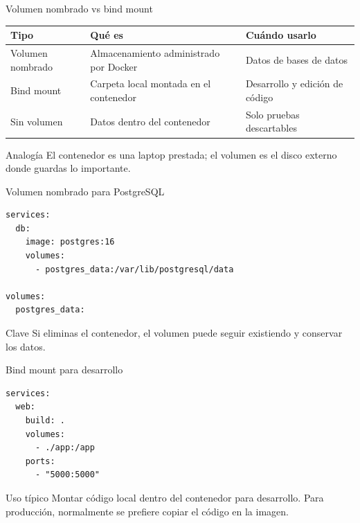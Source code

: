 \documentclass[aspectratio=169]{beamer}
\begin{document}
\begin{frame}{Volumen nombrado vs bind mount}
  \footnotesize
  \begin{tabular}{p{} p{} p{}}
    \toprule
    Tipo & Qué es & Cuándo usarlo \\
    \midrule
    Volumen nombrado & Almacenamiento administrado por Docker & Datos de bases de datos \\
    Bind mount & Carpeta local montada en el contenedor & Desarrollo y edición de código \\
    Sin volumen & Datos dentro del contenedor & Solo pruebas descartables \\
    \bottomrule
  \end{tabular}
  \vspace{0.2cm}
  \begin{block}{Analogía}
    El contenedor es una laptop prestada; el volumen es el disco externo donde guardas lo importante.
  \end{block}
\end{frame}

\begin{frame}[fragile]{Volumen nombrado para PostgreSQL}
\begin{lstlisting}[style=terminal, basicstyle=\ttfamily\scriptsize]
services:
  db:
    image: postgres:16
    volumes:
      - postgres_data:/var/lib/postgresql/data

volumes:
  postgres_data:
\end{lstlisting}
  \begin{alertblock}{Clave}
    Si eliminas el contenedor, el volumen puede seguir existiendo y conservar los datos.
  \end{alertblock}
\end{frame}

\begin{frame}[fragile]{Bind mount para desarrollo}
\begin{lstlisting}[style=terminal, basicstyle=\ttfamily\scriptsize]
services:
  web:
    build: .
    volumes:
      - ./app:/app
    ports:
      - "5000:5000"
\end{lstlisting}
  \begin{block}{Uso típico}
    Montar código local dentro del contenedor para desarrollo. Para producción, normalmente se prefiere copiar el código en la imagen.
  \end{block}
\end{frame}
\end{document}
